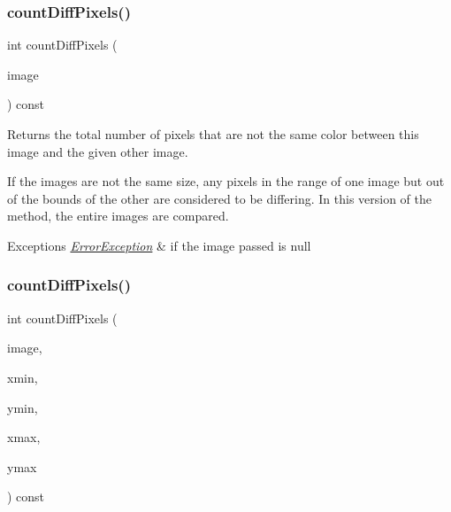 \subsubsection{\texorpdfstring{count\+Diff\+Pixels()}{countDiffPixels()}\hspace{0.1cm}{\footnotesize\ttfamily [3/4]}}
{\footnotesize\ttfamily int count\+Diff\+Pixels (\begin{DoxyParamCaption}\item[{const \mbox{\hyperlink{classGCanvas}{G\+Canvas}} $\ast$}]{image }\end{DoxyParamCaption}) const\hspace{0.3cm}{\ttfamily [virtual]}}



Returns the total number of pixels that are not the same color between this image and the given other image. 

If the images are not the same size, any pixels in the range of one image but out of the bounds of the other are considered to be differing. In this version of the method, the entire images are compared. 
\begin{DoxyExceptions}{Exceptions}
{\em \mbox{\hyperlink{classErrorException}{Error\+Exception}}} & if the image passed is null \\
\hline
\end{DoxyExceptions}
\mbox{\label{classGCanvas_a77b38a94630c93ecc697fb12a1fb89fd}} 
\subsubsection{\texorpdfstring{count\+Diff\+Pixels()}{countDiffPixels()}\hspace{0.1cm}{\footnotesize\ttfamily [4/4]}}
{\footnotesize\ttfamily int count\+Diff\+Pixels (\begin{DoxyParamCaption}\item[{const \mbox{\hyperlink{classGCanvas}{G\+Canvas}} $\ast$}]{image,  }\item[{int}]{xmin,  }\item[{int}]{ymin,  }\item[{int}]{xmax,  }\item[{int}]{ymax }\end{DoxyParamCaption}) const\hspace{0.3cm}{\ttfamily [virtual]}}



